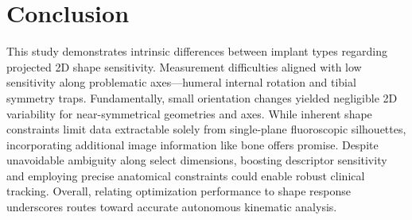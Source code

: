 \section{Conclusion}
This study demonstrates intrinsic differences between implant types regarding projected 2D shape sensitivity.
Measurement difficulties aligned with low sensitivity along problematic axes—humeral internal rotation and tibial symmetry traps.
Fundamentally, small orientation changes yielded negligible 2D variability for near-symmetrical geometries and axes.
While inherent shape constraints limit data extractable solely from single-plane fluoroscopic silhouettes, incorporating additional image information like bone offers promise.
Despite unavoidable ambiguity along select dimensions, boosting descriptor sensitivity and employing precise anatomical constraints could enable robust clinical tracking.
Overall, relating optimization performance to shape response underscores routes toward accurate autonomous kinematic analysis.

